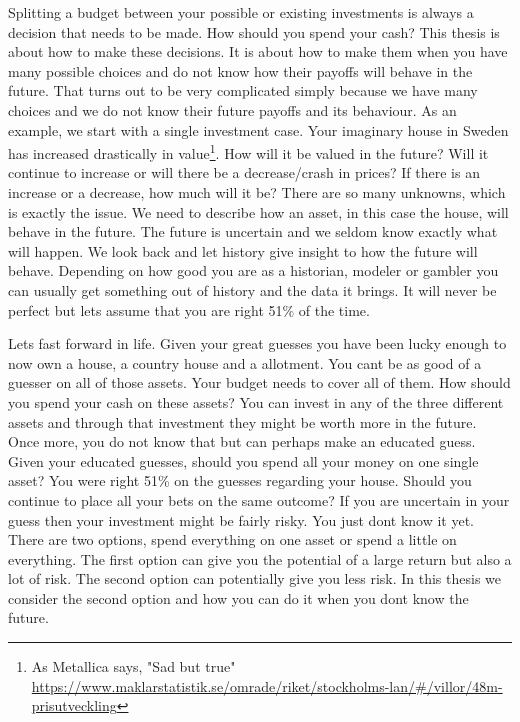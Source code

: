 Splitting a budget between your possible or existing investments is always a decision that needs to be made.
How should you spend your cash?
This thesis is about how to make these decisions.
It is about how to make them when you have many possible choices and do not know how their payoffs will behave in the future.
That turns out to be very complicated simply because we have many choices and we do not know their future payoffs and its behaviour.
As an example, we start with a single investment case. 
Your imaginary house in Sweden has increased drastically in value\footnote{As Metallica says, "Sad but true" \url{https://www.maklarstatistik.se/omrade/riket/stockholms-lan/\#/villor/48m-prisutveckling}}.
How will it be valued in the future?
Will it continue to increase or will there be a decrease/crash in prices?
If there is an increase or a decrease, how much will it be?
There are so many unknowns, which is exactly the issue.
We need to describe how an asset, in this case the house, will behave in the future.
The future is uncertain and we seldom know exactly what will happen.
We look back and let history give insight to how the future will behave.
Depending on how good you are as a historian, modeler or gambler you can usually get something out of history and the data it brings.
It will never be perfect but lets assume that you are right 51\% of the time.

Lets fast forward in life.
Given your great guesses you have been lucky enough to now own a house, a country house and a allotment.
You cant be as good of a guesser on all of those assets.
Your budget needs to cover all of them.
How should you spend your cash on these assets?
You can invest in any of the three different assets and through that investment they might be worth more in the future.
Once more, you do not know that but can perhaps make an educated guess.
Given your educated guesses, should you spend all your money on one single asset?
You were right 51\% on the guesses regarding your house.
Should you continue to place all your bets on the same outcome? 
If you are uncertain in your guess then your investment might be fairly risky.
You just dont know it yet.
There are two options, spend everything on one asset or spend a little on everything.
The first option can give you the potential of a large return but also a lot of risk.
The second option can potentially give you less risk.
In this thesis we consider the second option and how you can do it when you dont know the future.

